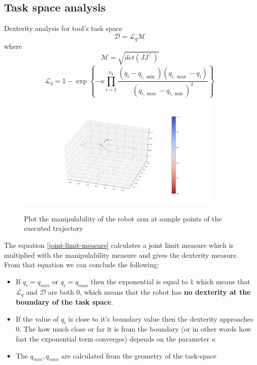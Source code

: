 \subsection{Task space analysis}

Dexterity analysis for tool's task space
\begin{equation}
\mathcal{D} = \mathcal{L}_q \mathcal{M}
\end{equation}
where
\begin{equation}
\mathcal{M} = \sqrt{det(J J^\top)}
\end{equation}
\begin{equation}
\label{joint-limit-measure}
\mathcal{L}_{q}=1-\exp\left\{-\kappa\prod_{i=1}^{n_{k}}\frac{(q_{ {i}}-q_{i,\min})(q_{i,\max}-q_{i})}{(q_{i,\max}-q_{i,\min})^{2}}\right\}
\end{equation}

\begin{center}
\begin{figure}[H]
\centering
\includegraphics[width=10cm]{images/robot-planner1-manipulability-plot.png}\\
\caption{Plot the manipulability of the robot arm at sample points of the executed trajectory}
\end{figure}
\end{center}

The equation \ref{joint-limit-measure} calculates a joint limit measure which is multiplied with the manipulability measure and gives the dexterity measure.
From that equation we can conclude the following:
\begin{itemize}
\item If $q_i = q_{min}$ or $q_i = q_{max}$ then the exponential is equal to 1 which means that $\mathcal{L}_{q}$ and $\mathcal{D}$ are both 0, which means 
that the robot has \textbf{no dexterity at the boundary of the task space}.
\item If the value of $q_i$ is close to it's boundary value then the dexterity approaches 0. The how much close or far it is from the boundary (or in other words 
how fast the exponential term converges) depends on the parameter $\kappa$
\item The $q_{min}, q_{max}$ are calculated from the geometry of the task-space
\end{itemize}

